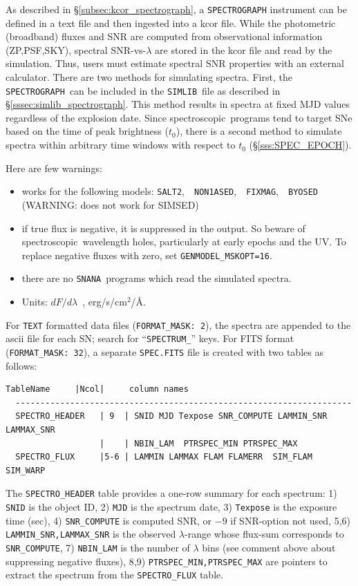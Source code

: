 \documentclass[12pt]{article}
\newcommand{\SPEC}{{\tt SPECTROGRAPH}}
\newcommand{\Flam}{dF/d\lambda}
\newcommand{\snana}{{\tt SNANA}}
\newcommand{\simlib}{{\tt SIMLIB}}
\newcommand{\spec}{spectroscopic}
\begin{document}
As described in \S\ref{subsec:kcor_spectrograph}, 
a {\SPEC} instrument can be defined in a text file
and then ingested into a kcor file.
While the photometric (broadband) fluxes and SNR are computed 
from observational information (ZP,PSF,SKY), 
spectral SNR-vs-$\lambda$ are stored in the kcor file and 
read by the simulation.
Thus, users must estimate spectral SNR properties with an 
external calculator. There are two methods for simulating spectra.
First, the \SPEC\ can be included in the \simlib\ file
as described in \S\ref{sssec:simlib_spectrograph}.
This method results in spectra at fixed MJD values
regardless of the explosion date. Since \spec\ programs
tend to target SNe based on the time of peak brightness ($t_0$),
there is a second method to simulate spectra within arbitrary 
time windows with respect to $t_0$ (\S\ref{sss:SPEC_EPOCH}).


\medskip
Here are few warnings:
\begin{itemize}
  \item works for the following models: 
       {\tt SALT2},~~{\tt NON1ASED},~~{\tt FIXMAG},~~{\tt BYOSED} \\
         (WARNING: does not work for SIMSED)
  \item if true flux is negative, it is suppressed in the output. 
        So beware of \spec\ wavelength holes, 
        particularly at early epochs and the UV.
        To replace negative fluxes with zero, set {\tt GENMODEL\_MSKOPT=16}.
%
  \item there are no \snana\ programs which read the simulated spectra.
  \item Units: $\Flam$~, erg/s/cm$^2$/\AA.
\end{itemize}

\medskip
For {\tt TEXT} formatted data files ({\tt FORMAT\_MASK: 2}),
the spectra are appended to the ascii file for each SN; 
search for ``{\tt SPECTRUM\_}'' keys.
For FITS format ({\tt FORMAT\_MASK: 32}), 
a separate {\tt *SPEC.FITS} file is created
with two tables as follows:

\begin{Verbatim}[frame=single]
     TableName     |Ncol|     column names 
  --------------------------------------------------------------------
  SPECTRO_HEADER   | 9  | SNID MJD Texpose SNR_COMPUTE LAMMIN_SNR LAMMAX_SNR
                   |    | NBIN_LAM  PTRSPEC_MIN PTRSPEC_MAX
  SPECTRO_FLUX     |5-6 | LAMMIN LAMMAX FLAM FLAMERR  SIM_FLAM  SIM_WARP
\end{Verbatim}
%
The {\tt SPECTRO\_HEADER} table provides a one-row summary for 
each spectrum:
1) {\tt SNID} is the object ID, 
2) {\tt MJD} is the spectrum date, 
3) {\tt Texpose}  is the exposure time (sec), 
4) {\tt SNR\_COMPUTE} is computed SNR, or $-9$ if SNR-option not used,
5,6) {\tt LAMMIN\_SNR,LAMMAX\_SNR} is the observed $\lambda$-range
  whose flux-sum corresponds to {\tt SNR\_COMPUTE},
7) {\tt NBIN\_LAM} is the number of $\lambda$ bins
(see comment above about suppressing negative fluxes), 
8,9) {\tt PTRSPEC\_MIN,PTRSPEC\_MAX} are  pointers to extract the 
spectrum from the {\tt SPECTRO\_FLUX} table.
\end{document}
